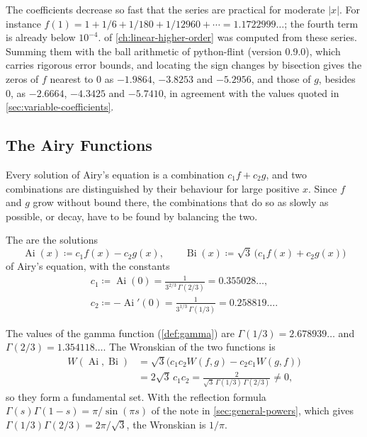 The coefficients decrease so fast that the series are practical for moderate $|x|$. For instance $f(1)=1+1/6+1/180+1/12960+\cdots=1.1722999\ldots$; the fourth term is already below $10^{-4}$.  of \cref{ch:linear-higher-order} was computed from these series. Summing them with the ball arithmetic of python-flint (version 0.9.0), which carries rigorous error bounds, and locating the sign changes by bisection gives the zeros of $f$ nearest to $0$ as $-1.9864$, $-3.8253$ and $-5.2956$, and those of $g$, besides $0$, as $-2.6664$, $-4.3425$ and $-5.7410$, in agreement with the values quoted in \cref{sec:variable-coefficients}.

\subsection{The Airy Functions}

Every solution of Airy's equation is a combination $c_1f+c_2g$, and two combinations are distinguished by their behaviour for large positive $x$. Since $f$ and $g$ grow without bound there, the combinations that do so as slowly as possible, or decay, have to be found by balancing the two.

\begin{definition}
\label{def:airy-functions}
The  are the solutions
\[
\operatorname{Ai}(x)\coloneqq c_1f(x)-c_2g(x),\qquad\operatorname{Bi}(x)\coloneqq\sqrt3\,\bigl(c_1f(x)+c_2g(x)\bigr)
\]
of Airy's equation, with the constants
\begin{gather*}
c_1\coloneqq\operatorname{Ai}(0)=\frac1{3^{2/3}\,\Gamma(2/3)}=0.355028\ldots,\\
c_2\coloneqq-\operatorname{Ai}'(0)=\frac1{3^{1/3}\,\Gamma(1/3)}=0.258819\ldots .
\end{gather*}
\end{definition}

The values of the gamma function (\cref{def:gamma}) are $\Gamma(1/3)=2.678939\ldots$ and $\Gamma(2/3)=1.354118\ldots$. The Wronskian of the two functions is
\begin{align*}
W(\operatorname{Ai},\operatorname{Bi})&=\sqrt3\bigl(c_1c_2W(f,g)-c_2c_1W(g,f)\bigr)\\
&=2\sqrt3\,c_1c_2=\frac{2}{\sqrt3\,\Gamma(1/3)\,\Gamma(2/3)}\ne0 ,
\end{align*}
so they form a fundamental set. With the reflection formula $\Gamma(s)\Gamma(1-s)=\pi/\sin(\pi s)$ of the note in \cref{sec:general-powers}, which gives $\Gamma(1/3)\Gamma(2/3)=2\pi/\sqrt3$, the Wronskian is $1/\pi$.

